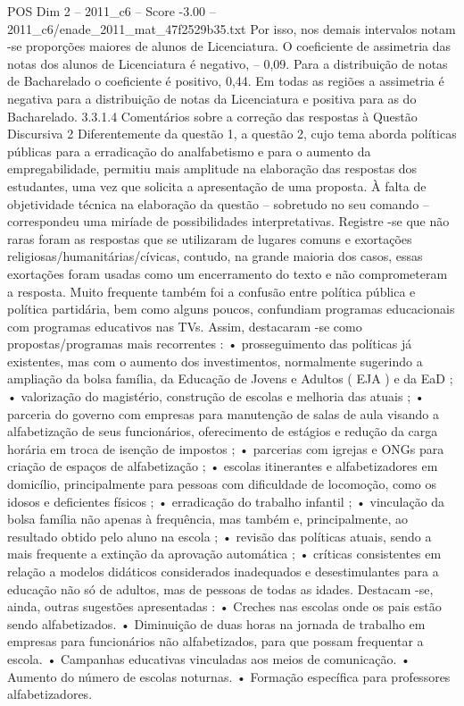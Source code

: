 \begin{textsample}{POS Dim 2 – 2011\_c6 – Score -3.00 – 2011\_c6/enade\_2011\_mat\_47f2529b35.txt}
Por isso, nos demais intervalos notam -se proporções maiores de alunos de Licenciatura.
O coeficiente de assimetria das notas dos alunos de Licenciatura é negativo, – 0,09.
Para a distribuição de notas de Bacharelado o coeficiente é positivo, 0,44.
Em todas as regiões a assimetria é negativa para a distribuição de notas da Licenciatura e positiva para as do Bacharelado. 3.3.1.4 Comentários sobre a correção das respostas à Questão Discursiva 2 Diferentemente da questão 1, a questão 2, cujo tema aborda políticas públicas para a erradicação do analfabetismo e para o aumento da empregabilidade, permitiu mais amplitude na elaboração das respostas dos estudantes, uma vez que solicita a apresentação de uma proposta.
À falta de objetividade técnica na elaboração da questão – sobretudo no seu comando – correspondeu uma miríade de possibilidades interpretativas.
Registre -se que não raras foram as respostas que se utilizaram de lugares comuns e exortações religiosas/humanitárias/cívicas, contudo, na grande maioria dos casos, essas exortações foram usadas como um encerramento do texto e não comprometeram a resposta.
Muito frequente também foi a confusão entre política pública e política partidária, bem como alguns poucos, confundiam programas educacionais com programas educativos nas TVs.
Assim, destacaram -se como propostas/programas mais recorrentes : • prosseguimento das políticas já existentes, mas com o aumento dos investimentos, normalmente sugerindo a ampliação da bolsa família, da Educação de Jovens e Adultos ( EJA ) e da EaD ; • valorização do magistério, construção de escolas e melhoria das atuais ; • parceria do governo com empresas para manutenção de salas de aula visando a alfabetização de seus funcionários, oferecimento de estágios e redução da carga horária em troca de isenção de impostos ; • parcerias com igrejas e ONGs para criação de espaços de alfabetização ; • escolas itinerantes e alfabetizadores em domicílio, principalmente para pessoas com dificuldade de locomoção, como os idosos e deficientes físicos ; • erradicação do trabalho infantil ; • vinculação da bolsa família não apenas à frequência, mas também e, principalmente, ao resultado obtido pelo aluno na escola ; • revisão das políticas atuais, sendo a mais frequente a extinção da aprovação automática ; • críticas consistentes em relação a modelos didáticos considerados inadequados e desestimulantes para a educação não só de adultos, mas de pessoas de todas as idades.
Destacam -se, ainda, outras sugestões apresentadas : • Creches nas escolas onde os pais estão sendo alfabetizados. • Diminuição de duas horas na jornada de trabalho em empresas para funcionários não alfabetizados, para que possam frequentar a escola. • Campanhas educativas vinculadas aos meios de comunicação. • Aumento do número de escolas noturnas. • Formação específica para professores alfabetizadores.

\end{textsample}
